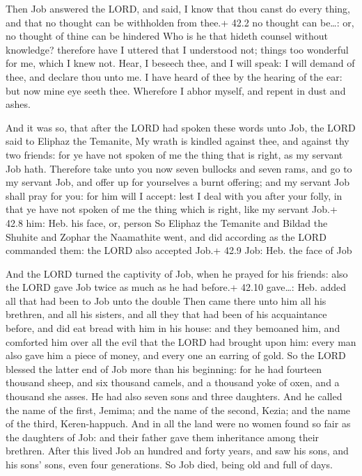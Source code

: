  Then Job answered the LORD, and said,  I know
that thou canst do every thing, and that no thought can be withholden
from thee.+ 42.2 no thought can be\ldots: or, no thought of thine can be
hindered  Who is he that hideth counsel without knowledge?
therefore have I uttered that I understood not; things too wonderful for
me, which I knew not.  Hear, I beseech thee, and I will
speak: I will demand of thee, and declare thou unto me.  I
have heard of thee by the hearing of the ear: but now mine eye seeth
thee.  Wherefore I abhor myself, and repent in dust and
ashes.

 And it was so, that after the LORD had spoken these words
unto Job, the LORD said to Eliphaz the Temanite, My wrath is kindled
against thee, and against thy two friends: for ye have not spoken of me
the thing that is right, as my servant Job hath.  Therefore
take unto you now seven bullocks and seven rams, and go to my servant
Job, and offer up for yourselves a burnt offering; and my servant Job
shall pray for you: for him will I accept: lest I deal with you after
your folly, in that ye have not spoken of me the thing which is right,
like my servant Job.+ 42.8 him: Heb. his face, or, person 
So Eliphaz the Temanite and Bildad the Shuhite and Zophar the Naamathite
went, and did according as the LORD commanded them: the LORD also
accepted Job.+ 42.9 Job: Heb. the face of Job

 And the LORD turned the captivity of Job, when he prayed
for his friends: also the LORD gave Job twice as much as he had before.+
42.10 gave\ldots: Heb. added all that had been to Job unto the double
 Then came there unto him all his brethren, and all his
sisters, and all they that had been of his acquaintance before, and did
eat bread with him in his house: and they bemoaned him, and comforted
him over all the evil that the LORD had brought upon him: every man also
gave him a piece of money, and every one an earring of gold.
 So the LORD blessed the latter end of Job more than his
beginning: for he had fourteen thousand sheep, and six thousand camels,
and a thousand yoke of oxen, and a thousand she asses.  He
had also seven sons and three daughters.  And he called the
name of the first, Jemima; and the name of the second, Kezia; and the
name of the third, Keren-happuch.  And in all the land were
no women found so fair as the daughters of Job: and their father gave
them inheritance among their brethren.  After this lived
Job an hundred and forty years, and saw his sons, and his sons' sons,
even four generations.  So Job died, being old and full of
days.
